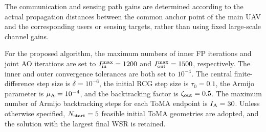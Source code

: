\documentclass[letterpaper,journal]{IEEEtran}
\begin{document}
The communication and sensing path gains are determined according to
the actual propagation distances between the common anchor point of the
main UAV and the corresponding users or sensing targets, rather than
using fixed large-scale channel gains.

For the proposed algorithm, the maximum numbers of inner FP iterations
and joint AO iterations are set to
$I_{\rm in}^{\max}=1200$ and $I_{\rm out}^{\max}=1500$, respectively.
The inner and outer convergence tolerances are both set to $10^{-4}$.
The central finite-difference step size is $\delta=10^{-6}$, the initial
RCG step size is $\tau_0=0.1$, the Armijo parameter is
$\mu_{\rm A}=10^{-4}$, and the backtracking factor is
$\zeta_{\rm out}=0.5$. The maximum number of Armijo backtracking steps
for each ToMA endpoint is $I_{\rm A}=30$. Unless otherwise specified,
$N_{\rm start}=5$ feasible initial ToMA geometries are adopted, and the
solution with the largest final WSR is retained.
\end{document}
